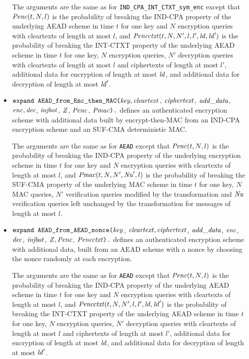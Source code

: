 \documentclass{article}
\begin{document}
\begin{itemize}
   The arguments are the same as for
   \texttt{IND\_CPA\_INT\_CTXT\_sym\_enc} except that $\mathit{Penc}(t, N,
   l)$ is the probability of breaking the IND-CPA property of the
   underlying AEAD scheme in time $t$ for one key and $N$ encryption
   queries with cleartexts of length at most $l$, and
   $\mathit{Pencctxt}(t, N, N', l, l', \mathit{ld}, \mathit{ld}')$ is the
   probability of breaking the INT-CTXT property of the underlying
   AEAD scheme in time $t$ for one key, $N$ encryption queries, $N'$
   decryption queries with cleartexts of length at most $l$ and
   ciphertexts of length at most $l'$, additional data for encryption
   of length at most $\mathit{ld}$, and additional data for decryption of
   length at most $\mathit{ld}'$.

\item $\texttt{expand AEAD\_from\_Enc\_then\_MAC(}\mathit{key},
  \mathit{cleartext}$, $\mathit{ciphertext}$, $\mathit{add\_data}$, $\mathit{enc},
  \mathit{dec}$, $\mathit{injbot}$, $\mathit{Z}$, $\mathit{Penc}$, $\mathit{Pmac}\texttt{).}$ defines an
authenticated encryption scheme with additional data built by encrypt-then-MAC from an IND-CPA encryption scheme and an SUF-CMA deterministic MAC.

The arguments are the same as for \texttt{AEAD} except that $\mathit{Penc}(t, N, l)$ is the probability of breaking the IND-CPA
  property of the underlying encryption scheme in time $t$ for one key and $N$ encryption queries with
  cleartexts of length at most $l$, and
  $\mathit{Pmac}(t, N, N', \mathit{Nu}', l)$ is the probability of breaking the SUF-CMA
   property of the underlying MAC scheme in time $t$ for one key, $N$ MAC queries, $N'$ verification
   queries modified by the transformation and $\mathit{Nu}$ verification
   queries left unchanged by the transformation for messages of length at most $l$.

\item 
   $\texttt{expand\ AEAD\_from\_AEAD\_nonce(}\vn{key}$, $\mathit{cleartext},
   \mathit{ciphertext}$, $\mathit{add\_data}$, $\mathit{enc}$, $\mathit{dec}$, $\mathit{injbot}$, $\mathit{Z},
   \mathit{Penc}$, $\mathit{Pencctxt}\texttt{).}$ defines an authenticated
   encryption scheme with additional data, built from an AEAD scheme with a nonce
   by choosing the nonce randomly at each encryption.

   The arguments are the same as for
   \texttt{AEAD} except that $\mathit{Penc}(t, N,
   l)$ is the probability of breaking the IND-CPA property of the
   underlying AEAD scheme in time $t$ for one key and $N$ encryption
   queries with cleartexts of length at most $l$, and
   $\mathit{Pencctxt}(t, N, N', l, l', \mathit{ld}, \mathit{ld}')$ is the
   probability of breaking the INT-CTXT property of the underlying
   AEAD scheme in time $t$ for one key, $N$ encryption queries, $N'$
   decryption queries with cleartexts of length at most $l$ and
   ciphertexts of length at most $l'$, additional data for encryption
   of length at most $\mathit{ld}$, and additional data for decryption of
   length at most $\mathit{ld}'$.
   
\end{itemize}
\end{document}
